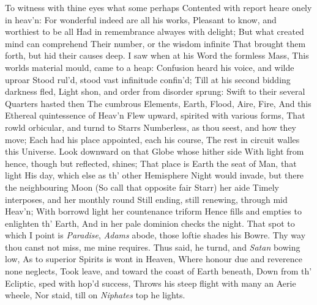 \documentclass[11pt]{book}
\begin{document}
To witness with thine eyes what some perhaps 
Contented with report heare onely in heav'n: 
For wonderful indeed are all his works, 
Pleasant to know, and worthiest to be all 
Had in remembrance alwayes with delight; 
But what created mind can comprehend 
Their number, or the wisdom infinite 
That brought them forth, but hid their causes deep. 
I saw when at his Word the formless Mass, 
This worlds material mould, came to a heap: 
Confusion heard his voice, and wilde uproar 
Stood rul'd, stood vast infinitude confin'd; 
Till at his second bidding darkness fled, 
Light shon, and order from disorder sprung: 
Swift to their several Quarters hasted then 
The cumbrous Elements, Earth, Flood, Aire, Fire, 
And this Ethereal quintessence of Heav'n 
Flew upward, spirited with various forms, 
That rowld orbicular, and turnd to Starrs 
Numberless, as thou seest, and how they move; 
Each had his place appointed, each his course, 
The rest in circuit walles this Universe. 
Look downward on that Globe whose hither side 
With light from hence, though but reflected, shines; 
That place is Earth the seat of Man, that light 
His day, which else as th' other Hemisphere 
Night would invade, but there the neighbouring Moon 
(So call that opposite fair Starr) her aide 
Timely interposes, and her monthly round 
Still ending, still renewing, through mid Heav'n; 
With borrowd light her countenance triform 
Hence fills and empties to enlighten th' Earth, 
And in her pale dominion checks the night. 
That spot to which I point is \textit{Paradise}, 
\textit{Adams} abode, those loftie shades his Bowre. 
Thy way thou canst not miss, me mine requires. 
\quad Thus said, he turnd, and \textit{Satan} bowing low, 
As to superior Spirits is wont in Heaven, 
Where honour due and reverence none neglects, 
Took leave, and toward the coast of Earth beneath, 
Down from th' Ecliptic, sped with hop'd success, 
Throws his steep flight with many an Aerie wheele, 
Nor staid, till on \textit{Niphates} top he lights. 


\Book
 
\end{document}
